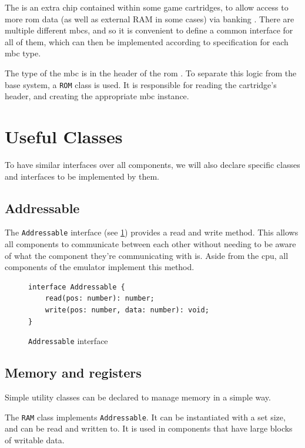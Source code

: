 \documentclass[11pt]{informatics-report}
\begin{document}
The  is an extra chip contained within some game cartridges, to allow access to more \gls{rom} data (as well as external RAM in some cases) via banking \cite[MBCs]{pandoc}. There are multiple different \glspl{mbc}, and so it is convenient to define a common interface for all of them, which can then be implemented according to specification for each \gls{mbc} type.

The type of the \gls{mbc} is in the header of the \gls{rom} \cite[The Cartridge Header]{pandoc}. To separate this logic from the base system, a \texttt{ROM} class is used. It is responsible for reading the cartridge's header, and creating the appropriate \gls{mbc} instance.

\section{Useful Classes}

To have similar interfaces over all components, we will also declare specific classes and interfaces to be implemented by them.

\subsection{Addressable}

The \texttt{Addressable} interface (see \ref{fig:addressable-interface}) provides a read and write method. This allows all components to communicate between each other without needing to be aware of what the component they're communicating with is. Aside from the \gls{cpu}, all components of the emulator implement this method.

\begin{figure}[h]
    \begin{verbatim}
interface Addressable {
    read(pos: number): number;
    write(pos: number, data: number): void;
}
    \end{verbatim}
    \caption{\texttt{Addressable} interface}
    \label{fig:addressable-interface}
\end{figure}

\subsection{Memory and registers}

Simple utility classes can be declared to manage memory in a simple way.

The \texttt{RAM} class implements \texttt{Addressable}. It can be instantiated with a set size, and can be read and written to. It is used in components that have large blocks of writable data.
\end{document}
